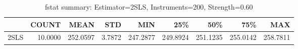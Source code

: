 \begin{table}[ht]
\centering
\caption{fstat summary: Estimator=2SLS, Instruments=200, Strength=0.60}
\begin{tabular}{lrrrrrrrr}
\toprule
 & COUNT & MEAN & STD & MIN & 25\% & 50\% & 75\% & MAX \\
\midrule
2SLS & 10.0000 & 252.0597 & 3.7872 & 247.2877 & 249.8924 & 251.1235 & 255.0142 & 258.7811 \\
\bottomrule
\end{tabular}
\end{table}
